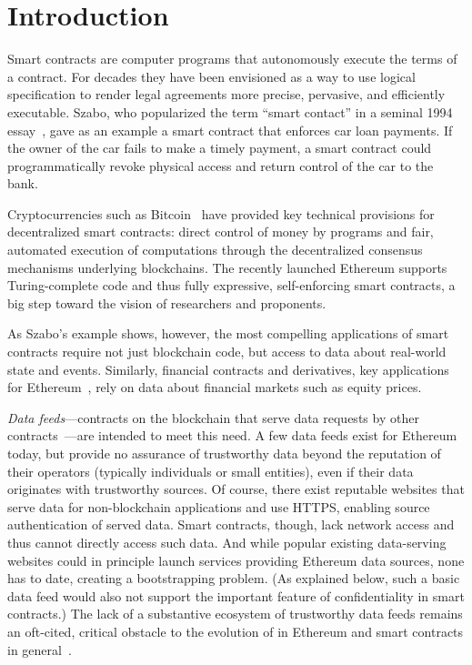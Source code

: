 \vspace{-2mm}
\section{Introduction}
\vspace{-2mm}

Smart contracts are computer programs that autonomously execute the terms of a contract.
For decades they have been envisioned as a way to use logical specification to render legal agreements more precise, pervasive, and efficiently executable.
Szabo, who popularized the term ``smart contact'' in a seminal 1994 essay~\cite{szabosmartcontract94}, gave as an example a smart contract that enforces car loan payments. If the owner of the car fails to make a timely payment, a smart contract could programmatically revoke physical access and return control of the car to the bank. %

Cryptocurrencies such as Bitcoin~\cite{bitcoin} have provided key technical provisions for decentralized smart contracts: direct control of money by programs and fair, automated execution of computations through the decentralized consensus mechanisms underlying  blockchains. 
The recently launched Ethereum supports Turing-complete code and thus fully expressive, self-enforcing smart contracts, a big step toward the vision of researchers and proponents.  

As Szabo's example shows, however, the most compelling applications of smart contracts require not just blockchain code, but access to data about real-world state and events. Similarly, financial contracts and derivatives, key applications for Ethereum~\cite{yellowpaper,whitepaper}, rely on data about financial markets such as equity prices. %

\emph{Data feeds}---contracts on the blockchain that serve data requests by other contracts~\cite{whitepaper,yellowpaper}---are intended to meet this need. A few data feeds exist for Ethereum today, but provide no assurance of trustworthy data beyond the reputation of their operators (typically individuals or small entities), even if their data originates with trustworthy sources. Of course, there exist reputable websites that serve data for non-blockchain applications and use HTTPS, enabling source authentication of served data. Smart contracts, though, lack network access and thus cannot directly access such data. And while popular existing data-serving websites could in principle launch services providing Ethereum data sources, none has to date, creating a bootstrapping problem. (As explained below, such a basic data feed would also not support the important feature of confidentiality in smart contracts.) The lack of a substantive ecosystem of trustworthy data feeds remains an oft-cited, critical obstacle to the evolution of in Ethereum and smart contracts 
in general~\cite{commblockstream}.


